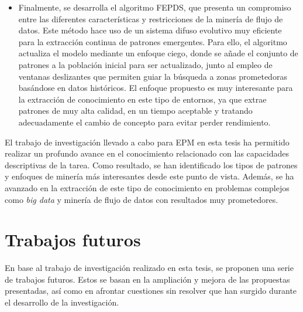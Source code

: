 \documentclass[c5paper,10pt,twoside]{book}	   	%
\begin{document}
\begin{itemize}
	\item Finalmente, se desarrolla el algoritmo FEPDS, que presenta un compromiso entre las diferentes características y restricciones de la minería de flujo de datos. Este método hace uso de un sistema difuso evolutivo muy eficiente para la extracción continua de patrones emergentes. Para ello, el algoritmo actualiza el modelo mediante un enfoque ciego, donde se añade el conjunto de patrones a la población inicial para ser actualizado, junto al empleo de ventanas deslizantes que permiten guiar la búsqueda a zonas prometedoras basándose en datos históricos. El enfoque propuesto es muy interesante para la extracción de conocimiento en este tipo de entornos, ya que extrae patrones de muy alta calidad, en un tiempo aceptable y tratando adecuadamente el cambio de concepto para evitar perder rendimiento.
\end{itemize}

El trabajo de investigación llevado a cabo para \ac{EPM} en esta tesis ha permitido realizar un profundo avance en el conocimiento relacionado con las capacidades descriptivas de la tarea. Como resultado, se han identificado los tipos de patrones y enfoques de minería más interesantes desde este punto de vista. Además, se ha avanzado en la extracción de este tipo de conocimiento en problemas complejos como \textit{big data} y minería de flujo de datos con resultados muy prometedores. 










\section{Trabajos futuros}

En base al trabajo de investigación realizado en esta tesis, se proponen una serie de trabajos futuros. Estos se basan en la ampliación y mejora de las propuestas presentadas, así como en afrontar cuestiones sin resolver que han surgido durante el desarrollo de la investigación. 
\end{document}
